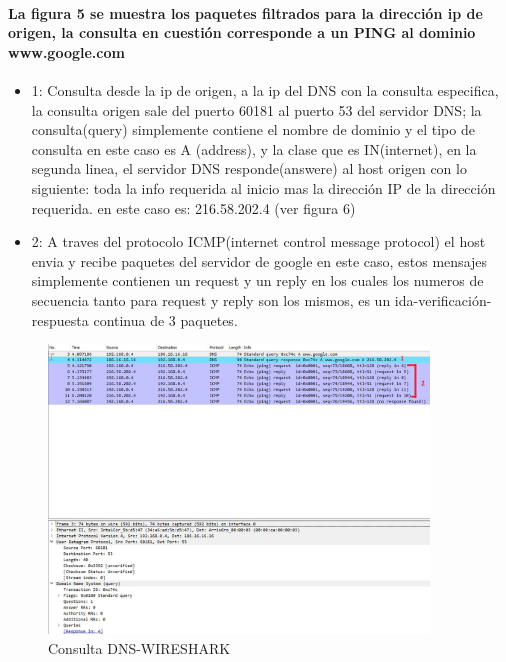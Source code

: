 \documentclass[letterpaper]{article}
\begin{document}
\paragraph{La figura 5 se  muestra los paquetes filtrados para la dirección ip de origen, la consulta en cuestión corresponde a un PING al dominio www.google.com }
\begin{itemize}
				
\item{1: Consulta desde la ip de origen, a la ip del DNS con la consulta especifica, la consulta origen sale del puerto 60181 al puerto 53 del servidor DNS; la consulta(query) simplemente contiene el nombre de dominio y el tipo de consulta en este caso es A (address), y la clase que es IN(internet), en la segunda linea, el servidor DNS responde(answere) al host origen con lo siguiente: toda la info requerida al inicio mas la dirección IP de la dirección requerida. en este caso es: 216.58.202.4 (ver figura 6)}


\item{2: A traves del protocolo ICMP(internet control message protocol) el host envia y recibe paquetes del servidor de google en este caso, estos mensajes simplemente contienen un request y un reply en los cuales los numeros de secuencia tanto para request y reply son los mismos, es un ida-verificación-respuesta continua de 3 paquetes. }

				\end{itemize}
\newpage
\begin{figure}[h]
	\centering
	\includegraphics[width=0.9\textwidth]{img/dns-1.jpg}
	\caption{Consulta DNS-WIRESHARK}
	\label{figura 5}
\end{figure}
\end{document}
